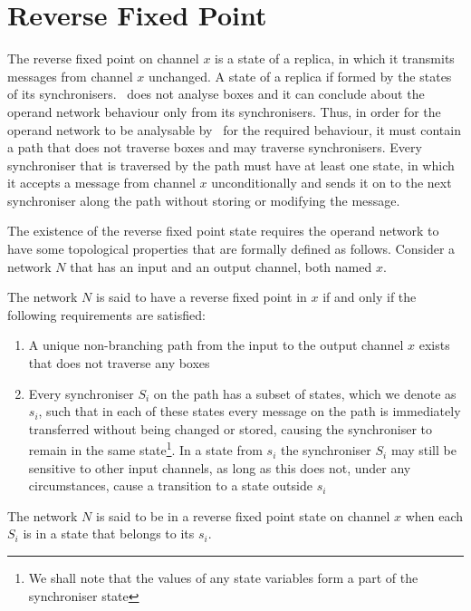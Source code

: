     \section{Reverse Fixed Point\label{rfp}}
The reverse fixed point on channel $x$ is a state of a replica, in which it transmits messages from channel $x$ unchanged. A state of a replica if formed by the states of its synchronisers. \ak\ does not analyse boxes and it can conclude about the operand network behaviour only from its synchronisers. Thus, in order for the operand network to be analysable by \ak\ for the required behaviour, it must contain a path that does not traverse boxes and may traverse synchronisers. Every synchroniser that is traversed by the path must have at least one state, in which it accepts a message from channel $x$ unconditionally and sends it on to the next synchroniser along the path without storing or modifying the message.

The existence of the reverse fixed point state requires the operand network to have some topological properties that are formally defined as follows. 
%
%
%
Consider a network $N$ that has an input and an output channel, both named $x$.

\begin{definition} The network $N$ is said to have a reverse fixed point in $x$ if and only if the following requirements are satisfied:

\begin{enumerate}
\item A unique non-branching path from the input to the output channel $x$ exists that does not traverse any boxes

\item Every synchroniser $S_i$ on the path has a subset of states, which we denote as $s_i$, such that in each of these states every message on the path is immediately transferred without being changed or stored, causing the synchroniser to remain in the same state\footnote{We shall note that the values of any state variables form a part of the synchroniser state}. In a state from $s_i$ the synchroniser $S_i$ may still be sensitive to other input channels, as long as this does not, under any circumstances, cause a transition to a state outside $s_i$
\end{enumerate}
The network $N$ is said to be in a reverse fixed point state on channel $x$ when each $S_i$ is in a state that belongs to its $s_i$.
\end{definition}




